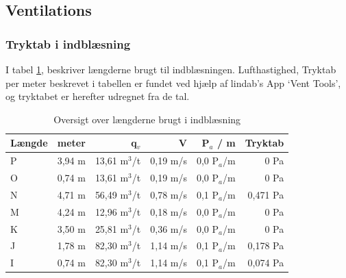 \subsection{Ventilations}

\subsubsection{Tryktab i indblæsning} \label{sub:tryktab_indblaesning}
I tabel \ref{table:oversigt_l_indblaesning}, beskriver længderne brugt til indblæsningen. 
Lufthastighed, Tryktab per meter beskrevet i tabellen er fundet ved hjælp af lindab's App `Vent Tools',
og tryktabet er herefter udregnet fra de tal.
\begin{table}[h!]
    \begin{center}
       \begin{tabular}{|l|r|r|r|r|r|}
           \hline
           Længde & meter & q$_{v}$ & V & P$_{a}$ / m & Tryktab\\
           \hline
            P & 3,94 m & 13,61 m$^3$/t & 0,19 m/s & 0,0 P$_{a}$/m & 0 Pa\\
            O & 0,74 m & 13,61 m$^3$/t & 0,19 m/s & 0,0 P$_{a}$/m & 0 Pa\\
            N & 4,71 m & 56,49 m$^3$/t & 0,78 m/s & 0,1 P$_{a}$/m & 0,471 Pa\\
            M & 4,24 m & 12,96 m$^3$/t & 0,18 m/s & 0,0 P$_{a}$/m & 0 Pa\\
            K & 3,50 m & 25,81 m$^3$/t & 0,36 m/s & 0,0 P$_{a}$/m & 0 Pa\\
            J & 1,78 m & 82,30 m$^3$/t & 1,14 m/s & 0,1 P$_{a}$/m & 0,178 Pa\\
            I & 0,74 m & 82,30 m$^3$/t & 1,14 m/s & 0,1 P$_{a}$/m & 0,074 Pa\\
           \hline
       \end{tabular}
   \end{center}
   \caption{Oversigt over længderne brugt i indblæsning}
   \label{table:oversigt_l_indblaesning}
\end{table}

